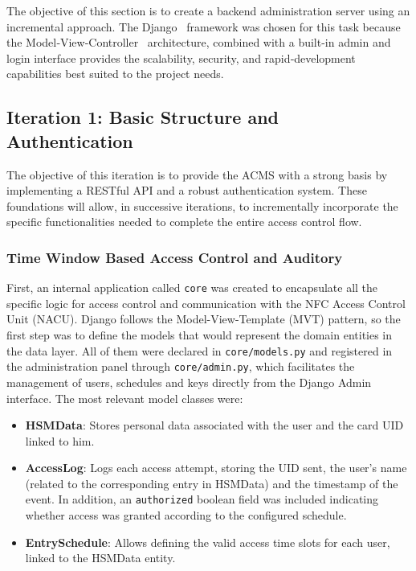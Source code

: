 The objective of this section is to create a backend administration server using an incremental approach. The Django~\cite{Ref20} framework was chosen for this task because the Model‑View‑Controller~\cite{Ref61} architecture, combined with a built-in admin and login interface provides the scalability, security, and rapid‑development capabilities best suited to the project needs.

\subsection{Iteration 1: Basic Structure and Authentication}

The objective of this iteration is to provide the ACMS with a strong basis by implementing a RESTful API and a robust authentication system. These foundations will allow, in successive iterations, to incrementally incorporate the specific functionalities needed to complete the entire access control flow.

\subsubsection{Time Window Based Access Control and Auditory}

First, an internal application called \texttt{core} was created to encapsulate all the specific logic for access control and communication with the NFC Access Control Unit (NACU). Django follows the Model-View-Template (MVT) pattern, so the first step was to define the models that would represent the domain entities in the data layer. All of them were declared in \texttt{core/models.py} and registered in the administration panel through \texttt{core/admin.py}, which facilitates the management of users, schedules and keys directly from the Django Admin interface. The most relevant model classes were:

\begin{itemize}
	\item \textbf{HSMData}: Stores personal data associated with the user and the card UID linked to him.
	\item \textbf{AccessLog}: Logs each access attempt, storing the UID sent, the user's name (related to the corresponding entry in HSMData) and the timestamp of the event. In addition, an \texttt{authorized} boolean field was included indicating whether access was granted according to the configured schedule.
	\item \textbf{EntrySchedule}: Allows defining the valid access time slots for each user, linked to the HSMData entity.
\end{itemize}


